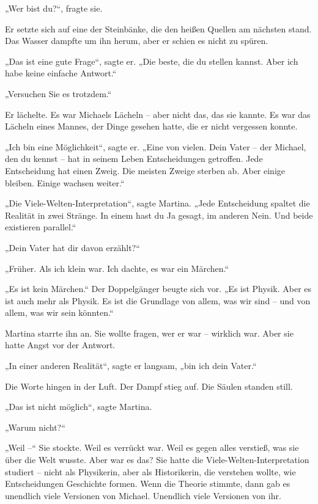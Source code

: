 \documentclass[
]{article}
\begin{document}
„Wer bist du?{\kern0pt}``, fragte sie.

Er setzte sich auf eine der Steinbänke, die den heißen Quellen am nächsten stand. Das Wasser dampfte um ihn herum, aber er schien es nicht zu spüren.

„Das ist eine gute Frage``, sagte er. „Die beste, die du stellen kannst. Aber ich habe keine einfache Antwort.``

„Versuchen Sie es trotzdem.``

Er lächelte. Es war Michaels Lächeln -- aber nicht das, das sie kannte. Es war das Lächeln eines Mannes, der Dinge gesehen hatte, die er nicht vergessen konnte.

„Ich bin eine Möglichkeit``, sagte er. „Eine von vielen. Dein Vater -- der Michael, den du kennst -- hat in seinem Leben Entscheidungen getroffen. Jede Entscheidung hat einen Zweig. Die meisten Zweige sterben ab. Aber einige bleiben. Einige wachsen weiter.``

„Die Viele-Welten-Interpretation``, sagte Martina. „Jede Entscheidung spaltet die Realität in zwei Stränge. In einem hast du Ja gesagt, im anderen Nein. Und beide existieren parallel.``

„Dein Vater hat dir davon erzählt?{\kern0pt}``

„Früher. Als ich klein war. Ich dachte, es war ein Märchen.``

„Es ist kein Märchen.`` Der Doppelgänger beugte sich vor. „Es ist Physik. Aber es ist auch mehr als Physik. Es ist die Grundlage von allem, was wir sind -- und von allem, was wir sein könnten.``

Martina starrte ihn an. Sie wollte fragen, wer er war -- wirklich war. Aber sie hatte Angst vor der Antwort.

„In einer anderen Realität``, sagte er langsam, „bin ich dein Vater.``

Die Worte hingen in der Luft. Der Dampf stieg auf. Die Säulen standen still.

„Das ist nicht möglich``, sagte Martina.

„Warum nicht?{\kern0pt}``

„Weil --`` Sie stockte. Weil es verrückt war. Weil es gegen alles verstieß, was sie über die Welt wusste. Aber war es das? Sie hatte die Viele-Welten-Interpretation studiert -- nicht als Physikerin, aber als Historikerin, die verstehen wollte, wie Entscheidungen Geschichte formen. Wenn die Theorie stimmte, dann gab es unendlich viele Versionen von Michael. Unendlich viele Versionen von ihr.
\end{document}

